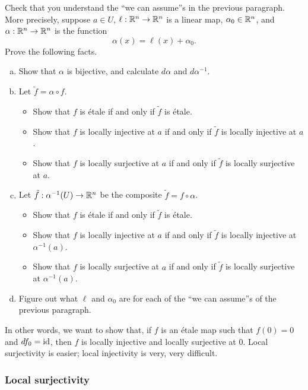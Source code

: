 \begin{exercise} \label{wlog-inverse-function-theorem}
	Check that you understand the ``we can assume''s in the previous paragraph. More precisely, suppose $a \in U$, $\ell : \mathbb{R}^n \to \mathbb{R}^n$ is a linear map, $\alpha_0 \in \mathbb{R}^n$, and $\alpha : \mathbb{R}^n \to \mathbb{R}^n$ is the function \[ \alpha(x) = \ell(x) + \alpha_0. \]
	Prove the following facts. 
	\begin{enumerate}[(a)]
		\item Show that $\alpha$ is bijective, and calculate $d\alpha$ and $d\alpha^{-1}$. 
		\item Let $\tilde{f} = \alpha \circ f$. 
		\begin{itemize}
			\item Show that $f$ is \'etale if and only if $\tilde{f}$ is \'etale. 
			\item Show that $f$ is locally injective at $a$ if and only if $\tilde{f}$ is locally injective at $a$. 
			\item Show that $f$ is locally surjective at $a$ if and only if $\tilde{f}$ is locally surjective at $a$.
		\end{itemize}  
		\item Let $\tilde{f} : \alpha^{-1}(U) \to \mathbb{R}^n$ be the composite $\tilde{f} = f \circ \alpha$. 
			\begin{itemize}
				\item Show that $f$ is \'etale if and only if $\tilde{f}$ is \'etale. 
				\item Show that $f$ is locally injective at $a$ if and only if $\tilde{f}$ is locally injective at $\alpha^{-1}(a)$. 
				\item Show that $f$ is locally surjective at $a$ if and only if $\tilde{f}$ is locally surjective at $\alpha^{-1}(a)$.
			\end{itemize} 
		\item Figure out what $\ell$ and $\alpha_0$ are for each of the ``we can assume''s of the previous paragraph. 
	\end{enumerate}
\end{exercise}

In other words, we want to show that, if $f$ is an \'etale map such that $f(0) = 0$ and $df_0 = \mathrm{id}$, then $f$ is locally injective and locally surjective at 0. Local surjectivity is easier; local injectivity is very, very difficult. 

\subsubsection*{Local surjectivity}

